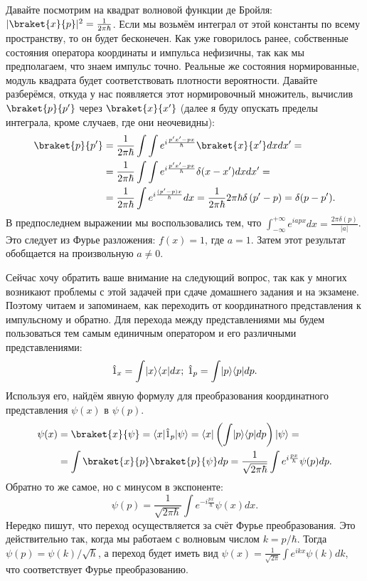 Давайте посмотрим на квадрат волновой функции де Бройля: $|\braket{x}{p}|^2 =
  \frac{1}{2 \pi \hbar}$. Если мы возьмём интеграл от этой константы по всему
пространству, то он будет бесконечен. Как уже говорилось ранее, собственные
состояния оператора координаты и импульса нефизичны, так как мы предполагаем,
что знаем импульс точно. Реальные же состояния нормированные, модуль квадрата
будет соответствовать плотности вероятности. Давайте разберёмся, откуда у нас
появляется этот нормировочный множитель, вычислив $\braket{p}{p'}$ через
$\braket{x}{x'}$ (далее я буду опускать пределы интеграла, кроме случаев, где
они неочевидны):
\begin{align*}
  \braket{p}{p'} &= \frac{1}{2 \pi \hbar} \int \int e^{i \frac{p'x' - px}{\hbar}} \braket{x}{x'} dx dx' = \\
  &= \frac{1}{2 \pi \hbar} \int \int e^{i \frac{p'x' - px}{\hbar}} \delta(x - x') dx dx' =\\
  &= \frac{1}{2 \pi \hbar}\int e^{i \frac{(p' - p) x}{\hbar}}dx =
  \frac{1}{2 \pi \hbar} 2 \pi \hbar \delta\left(p' - p\right) = \delta(p - p').
\end{align*}
В предпоследнем выражении мы воспользовались тем, что $\int_{-\infty}^{+\infty}
  e^{iapx} dx = \frac{2 \pi \delta(p)}{|a|}$. Это следует из Фурье разложения:
$f(x) = 1$, где $a=1$. Затем этот результат обобщается на произвольную $a\neq
  0$.

Сейчас хочу обратить ваше внимание на следующий вопрос, так как у многих
возникают проблемы с этой задачей при сдаче домашнего задания и на экзамене.
Поэтому читаем и запоминаем, как переходить от координатного представления к
импульсному и обратно. Для перехода между представлениями мы будем пользоваться
тем самым единичным оператором и его различными представлениями:
\[
  \hat{1}_x = \int \lvert x\rangle \langle x\rvert dx; \; \hat{1}_p = \int \lvert p\rangle \langle p\rvert dp.
\]
Используя его, найдём явную формулу для преобразования координатного
представления $\psi(x)$ в $\psi(p)$.
\begin{align*}
  \psi(x) &= \braket{x}{\psi} = \bra{x} \hat{1}_p \ket{\psi} = \bra{x}
  \left( \int \ket{p} \bra{p} dp \right) \ket{\psi} = \\
  &= \int \braket{x}{p} \braket{p}{\psi} dp =
  \frac{1}{\sqrt{2 \pi \hbar}} \int e^{i \frac{p x}{\hbar}} \psi(p) dp.
\end{align*}
Обратно то же самое, но с минусом в экспоненте:
\[
  \psi(p) = \frac{1}{\sqrt{2 \pi \hbar}} \int e^{-i \frac{p x}{\hbar}} \psi(x) dx.
\]
Нередко пишут, что переход осуществляется за счёт Фурье преобразования. Это
действительно так, когда мы работаем с волновым числом $k=p/\hbar$. Тогда
$\psi(p) = \psi(k)/\sqrt{\hbar}$, а переход будет иметь вид $\psi(x) =
  \frac{1}{\sqrt{2 \pi}}\int e^{i k x}\psi(k) dk$, что соответствует Фурье
преобразованию.

